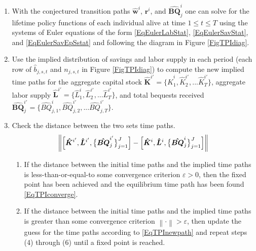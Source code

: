 \documentclass[letterpaper,12pt]{article}
\theoremstyle{definition}
\newcommand\ve{\varepsilon}
\newcommand\norm[1]{\left\lVert#1\right\rVert}
\begin{document}
\begin{enumerate}
\begin{enumerate}
      \end{enumerate}
    \item With the conjectured transition paths $\bm{\hat{w}}^i$, $\bm{r}^i$, and $\bm{\hat{BQ}}_j^i$ one can solve for the lifetime policy functions of each individual alive at time $1\leq t\leq T$ using the systems of Euler equations of the form \eqref{EqEulerLabStat}, \eqref{EqEulerSavStat}, and \eqref{EqEulerSavEpSstat} and following the diagram in Figure \ref{FigTPIdiag}.
    \item Use the implied distribution of savings and labor supply in each period (each row of $\hat{b}_{j,s,t}$ and $n_{j,s,t}$ in Figure \ref{FigTPIdiag}) to compute the new implied time paths for the aggregate capital stock $\bm{\hat{K}}^{i'} = \{\hat{K}_1^i,\hat{K}_2^{i'},...\hat{K}_T^{i'}\}$, aggregate labor supply $\bm{\hat{L}}^{i'} = \{\hat{L}_1^i,\hat{L}_2^{i'},...\hat{L}_T^{i'}\}$, and total bequests received $\bm{\hat{BQ}}_j^{i'} = \{\hat{BQ}_{j,1}^i,\hat{BQ}_{j,2}^{i'},...\hat{BQ}_{j,T}^{i'}\}$.
    \item Check the distance between the two sets time paths.
      \begin{equation*}
        \norm{\Bigl[\bm{\hat{K}}^{i'}, \bm{\hat{L}}^{i'},\bigl\{\bm{\hat{BQ}}_j^{i'}\bigr\}_{j=1}^J\Bigr] - \Bigl[\bm{\hat{K}}^{i},\bm{\hat{L}}^{i},\bigl\{\bm{\hat{BQ}}_j^{i}\bigr\}_{j=1}^J\Bigr]}
      \end{equation*}
      \begin{enumerate}
        \item If the distance between the initial time paths and the implied time paths is less-than-or-equal-to some convergence criterion $\ve>0$, then the fixed point has been achieved and the equilibrium time path has been found \eqref{EqTPIconverge}.
        \item If the distance between the initial time paths and the implied time paths is greater than some convergence criterion $\norm{\cdot}>\ve$, then update the guess for the time paths according to \eqref{EqTPInewpath} and repeat steps (4) through (6) until a fixed point is reached.
      \end{enumerate}
  \end{enumerate}

  \clearpage
\end{document}
